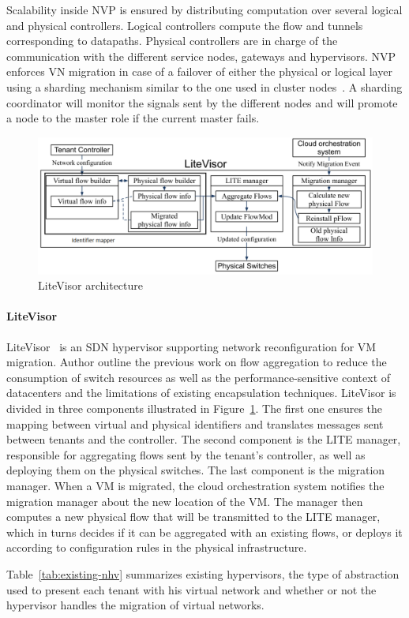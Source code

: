 Scalability inside NVP is ensured by distributing computation over several logical and physical controllers. Logical controllers compute the flow and tunnels corresponding to datapaths. Physical controllers are in charge of the communication with the different service nodes, gateways and hypervisors.
NVP enforces VN migration in case of a failover of either the physical or logical layer using a sharding mechanism similar to the one used in cluster nodes~\cite{sharding}. 
A sharding coordinator will monitor the signals sent by the different nodes and will promote a node to the master role if the current master fails.


\begin{figure}[ht]
    \centering
    \includegraphics[scale=0.5]{figures/litevisor.pdf}
    \caption{LiteVisor architecture~\cite{Litevisor-Yang2018}}
    \label{fig:litevisor}
\end{figure}

\paragraph{LiteVisor}
LiteVisor~\cite{Litevisor-Yang2018} is an SDN hypervisor supporting network reconfiguration for VM migration.
Author outline the previous work on flow aggregation to reduce the consumption of switch resources as well as the performance-sensitive context of datacenters and the limitations of existing encapsulation techniques.
LiteVisor is divided in three components illustrated in Figure~\ref{fig:litevisor}. The first one ensures the mapping between virtual and physical identifiers and translates messages sent between tenants and the controller.
The second component is the LITE manager, responsible for aggregating flows sent by the tenant's controller, as well as deploying them on the physical switches. 
The last component is the migration manager. When a VM is migrated, the cloud orchestration system notifies the migration manager about the new location of the VM. The manager then computes a new physical flow that will be transmitted to the LITE manager, which in turns decides if it can be aggregated with an existing flows, or deploys it according to configuration rules in the physical infrastructure.

Table~\ref{tab:existing-nhv} summarizes existing hypervisors, the type of abstraction used to present each tenant with his virtual network and whether or not the hypervisor handles the migration of virtual networks.